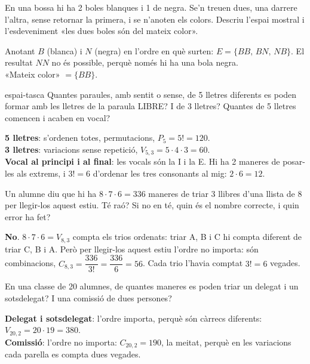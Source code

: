 \begin{apartats}

En una bossa hi ha 2 boles blanques i 1 de negra. Se'n treuen dues, una darrere l'altra, sense retornar la
primera, i se n'anoten els colors. Descriu l'espai mostral i l'esdeveniment «les dues boles són del mateix
color».

\begin{solucio}
Anotant $B$ (blanca) i $N$ (negra) en l'ordre en què surten: $E=\{BB,\,BN,\,NB\}$. El resultat $NN$ no és
possible, perquè només hi ha una bola negra.\\
«Mateix color» $=\{BB\}$.
\end{solucio}

\begin{tria}{espai-tasca}
Quantes paraules, amb sentit o sense, de 5 lletres diferents es poden formar amb les lletres de la
paraula LIBRE? I de 3 lletres? Quantes de 5 lletres comencen i acaben en vocal?

\begin{solucio}
\textbf{5 lletres}: s'ordenen totes, permutacions, $P_5=5!=120$.\\
\textbf{3 lletres}: variacions sense repetició, $V_{5,3}=5\cdot4\cdot3=60$.\\
\textbf{Vocal al principi i al final}: les vocals són la I i la E. Hi ha 2 maneres de posar-les als
extrems, i $3!=6$ d'ordenar les tres consonants al mig: $2\cdot6=12$.
\end{solucio}

Un alumne diu que hi ha $8\cdot7\cdot6=336$ maneres de triar 3 llibres d'una llista de 8 per llegir-los
aquest estiu. Té raó? Si no en té, quin és el nombre correcte, i quin error ha fet?

\begin{solucio}
\textbf{No}. $8\cdot7\cdot6=V_{8,3}$ compta els trios ordenats: triar A, B i C hi compta diferent de triar
C, B i A. Però per llegir-los aquest estiu l'ordre no importa: són combinacions,
$C_{8,3}=\dfrac{336}{3!}=\dfrac{336}{6}=56$. Cada trio l'havia comptat $3!=6$ vegades.
\end{solucio}
\end{tria}

\begin{nomesllarg}
En una classe de 20 alumnes, de quantes maneres es poden triar un delegat i un sotsdelegat? I una comissió
de dues persones?

\begin{solucio}
\textbf{Delegat i sotsdelegat}: l'ordre importa, perquè són càrrecs diferents: $V_{20,2}=20\cdot19=380$.\\
\textbf{Comissió}: l'ordre no importa: $C_{20,2}=190$, la meitat, perquè en les variacions cada parella
es compta dues vegades.
\end{solucio}
\end{nomesllarg}

\end{apartats}
